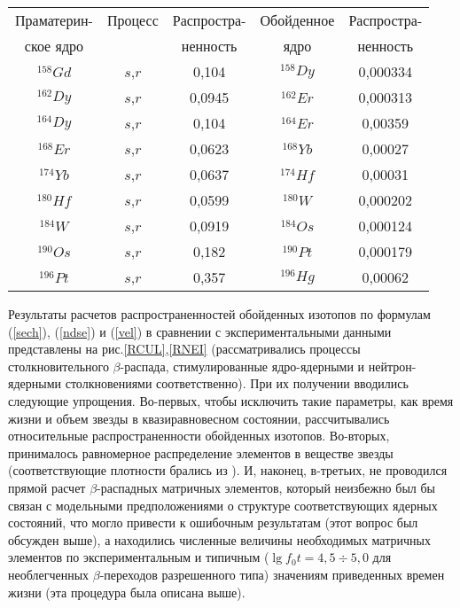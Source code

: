 \noindent
\begin{table}
\tabcolsep=5pt
\begin{tabular}{|c|c|c|c|c|}
\hline
 Праматерин-& Процесс & Распростра-&Обойденное&Распростра-\\
 ское ядро  &         & ненность&     ядро     &ненность\\
 \hline
  $^{158}Gd$ & $s$,$r$ & 0,104  & $^{158}Dy$ &  0,000334  \\
  $^{162}Dy$ & $s$,$r$ & 0,0945  & $^{162}Er$ & 0,000313   \\
  $^{164}Dy$ & $s$,$r$ & 0,104  & $^{164}Er$ &  0,00359  \\
  $^{168}Er$ & $s$,$r$ & 0,0623  & $^{168}Yb$ & 0,00027   \\
  $^{174}Yb$ & $s$,$r$ & 0,0637  & $^{174}Hf$ & 0,00031   \\
  $^{180}Hf$ & $s$,$r$ & 0,0599  & $^{180}W$ &  0,000202  \\
  $^{184}W$ & $s$,$r$ &  0,0919 & $^{184}Os$ &  0,000124  \\
  $^{190}Os$ & $s$,$r$ & 0,182  & $^{190}Pt$ &  0,000179  \\
  $^{196}Pt$ & $s$,$r$ & 0,357  & $^{196}Hg$ &  0,00062  \\
  \hline
\end{tabular}
\end{table}


 Результаты расчетов распространенностей
 обойденных изотопов по формулам (\ref{sech}), (\ref{ndse}) и (\ref{vel})
 в сравнении с экспериментальными данными представлены на рис.\ref{RCUL},\ref{RNEI}
(рассматривались процессы столкновительного $\beta$-распада, стимулированные ядро-ядерными и нейтрон-ядерными
столкновениями соответственно). При их получении вводились следующие упрощения. Во-первых, чтобы исключить такие
параметры, как время жизни и объем звезды в квазиравновесном состоянии, рассчитывались относительные распространенности
обойденных изотопов. Во-вторых, принималось равномерное распределение элементов в веществе звезды (соответствующие
плотности брались из \cite{iader}). И, наконец, в-третьих, не проводился прямой расчет $\beta$-распадных матричных
элементов, который  неизбежно был бы связан с модельными предположениями о структуре соответствующих ядерных состояний,
что могло привести к ошибочным результатам (этот вопрос был обсужден выше), а  находились численные величины необходимых
матричных элементов по экспериментальным и типичным ($\lg f_0t=4,5\div 5,0$ для необлегченных $\beta$-переходов
разрешенного типа) значениям приведенных времен жизни (эта процедура была описана выше).

